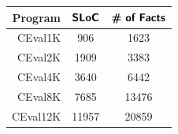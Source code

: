 \begin{tabular}{rcc}
\textbf{\textsf{Program}} & $\textbf{\textsf{SLoC}}$ & $\textbf{\textsf{\# of Facts}}$ \\
\midrule
CEval1K & 906 & 1623 \\
CEval2K & 1909 & 3383 \\
CEval4K & 3640 & 6442 \\
CEval8K & 7685 & 13476 \\
CEval12K & 11957 & 20859 \\
\end{tabular}